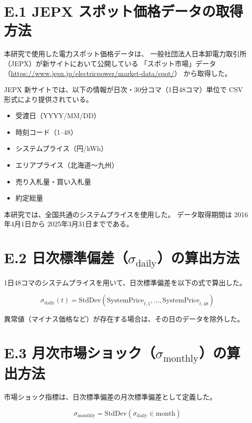\section*{E.1 JEPX スポット価格データの取得方法}

本研究で使用した電力スポット価格データは、
一般社団法人日本卸電力取引所（JEPX）が新サイトにおいて公開している
「スポット市場」データ
（\url{https://www.jepx.jp/electricpower/market-data/spot/}）
から取得した。

JEPX 新サイトでは、以下の情報が日次・30分コマ（1日48コマ）単位で
CSV 形式により提供されている。

\begin{itemize}
  \item 受渡日（YYYY/MM/DD）
  \item 時刻コード（1--48）
  \item システムプライス（円/kWh）
  \item エリアプライス（北海道〜九州）
  \item 売り入札量・買い入札量
  \item 約定総量
\end{itemize}

本研究では、全国共通のシステムプライスを使用した。
データ取得期間は 2016年4月1日から 2025年3月31日までである。

\section*{E.2 日次標準偏差（$\sigma_{\mathrm{daily}}$）の算出方法}

1日48コマのシステムプライスを用いて、日次標準偏差を以下の式で算出した。



\[
\sigma_{\mathrm{daily}}(t)
=
\mathrm{StdDev}
\left(
\mathrm{SystemPrice}_{t,1},\ldots,\mathrm{SystemPrice}_{t,48}
\right)
\]



異常値（マイナス価格など）が存在する場合は、その日のデータを除外した。

\section*{E.3 月次市場ショック（$\sigma_{\mathrm{monthly}}$）の算出方法}

市場ショック指標は、日次標準偏差の月次標準偏差として定義した。



\[
\sigma_{\mathrm{monthly}}
=
\mathrm{StdDev}\left(\sigma_{\mathrm{daily}} \in \text{month}\right)
\]



